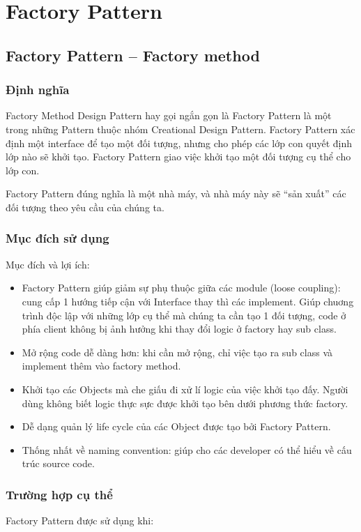 \chapter{Factory Pattern }
\section{Factory Pattern – Factory method}
\subsection{Định nghĩa}

Factory Method Design Pattern hay gọi ngắn gọn là Factory Pattern là một trong những Pattern thuộc nhóm Creational Design Pattern. Factory Pattern xác định một interface để tạo một đối tượng, nhưng cho phép các lớp con quyết định lớp nào sẽ khởi tạo.  Factory Pattern giao việc khởi tạo một đối tượng cụ thể cho lớp con.

Factory Pattern đúng nghĩa là một nhà máy, và nhà máy này sẽ “sản xuất” các đối tượng theo yêu cầu của chúng ta.

\subsection{Mục đích sử dụng}
Mục đích và lợi ích:
\begin{itemize}
\item	Factory Pattern giúp giảm sự phụ thuộc giữa các module (loose coupling): cung cấp 1 hướng tiếp cận với Interface thay thì các implement. Giúp chuơng trình độc lập với những lớp cụ thể mà chúng ta cần tạo 1 đối tượng, code ở phía client không bị ảnh hưởng khi thay đổi logic ở factory hay sub class.
\item Mở rộng code dễ dàng hơn: khi cần mở rộng, chỉ việc tạo ra sub class và implement thêm vào factory method.
\item Khởi tạo các Objects mà che giấu đi xử lí logic của việc khởi tạo đấy. Người dùng không biết logic thực sực được khởi tạo bên dưới phương thức factory.
\item Dễ dạng quản lý life cycle của các Object được tạo bởi Factory Pattern.
\item Thống nhất về naming convention: giúp cho các developer có thể hiểu về cấu trúc source code.
\end{itemize}

\subsection{Trường hợp cụ thể}
Factory Pattern được sử dụng khi:


